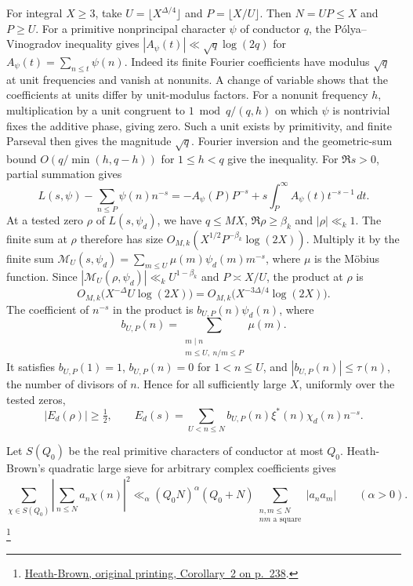 %
For integral \(X\ge3\), take \(U=\lfloor X^{\Delta/4}\rfloor\) and
\(P=\lfloor X/U\rfloor\). Then \(N=UP\le X\) and \(P\ge U\).
For a primitive nonprincipal character \(\psi\) of conductor \(q\),
the P\'olya--Vinogradov inequality gives
\(|A_\psi(t)|\ll\sqrt q\log(2q)\) for \(A_\psi(t)=\sum_{n\le t}\psi(n)\).
Indeed its finite Fourier coefficients have modulus \(\sqrt q\) at
unit frequencies and vanish at nonunits. A change of variable shows
that the coefficients at units differ by unit-modulus factors.
For a nonunit frequency \(h\), multiplication by a unit congruent to
\(1\bmod q/(q,h)\) on which \(\psi\) is nontrivial fixes the additive
phase, giving zero. Such a unit exists by primitivity, and finite
Parseval then gives the magnitude \(\sqrt q\).
Fourier inversion and the geometric-sum bound
\(O(q/\min(h,q-h))\) for \(1\le h<q\) give the inequality.
For \(\Re s>0\), partial summation gives
\[
 L(s,\psi)-\sum_{n\le P}\psi(n)n^{-s}
   =-A_\psi(P)P^{-s}+s\int_P^\infty A_\psi(t)t^{-s-1}\,dt .
\]
At a tested zero \(\rho\) of \(L(s,\psi_d)\), we have \(q\le MX\),
\(\Re\rho\ge\beta_k\) and \(|\rho|\ll_k1\). The finite sum at \(\rho\)
therefore has size \(O_{M,k}(X^{1/2}P^{-\beta_k}\log(2X))\).
Multiply it by the finite sum
\(\mathcal M_U(s,\psi_d)=\sum_{m\le U}\mu(m)\psi_d(m)m^{-s}\),
where \(\mu\) is the M\"obius function.
Since \(|\mathcal M_U(\rho,\psi_d)|\ll_k U^{1-\beta_k}\) and
\(P\asymp X/U\), the product at \(\rho\) is
\[
 O_{M,k}\bigl(X^{-\Delta}U\log(2X)\bigr)
     =O_{M,k}\bigl(X^{-3\Delta/4}\log(2X)\bigr).
\]
The coefficient of \(n^{-s}\) in the product is
\(b_{U,P}(n)\psi_d(n)\), where
\[
 b_{U,P}(n)=\sum_{\substack{m\mid n\\m\le U,\ n/m\le P}}\mu(m).
\]
It satisfies \(b_{U,P}(1)=1\), \(b_{U,P}(n)=0\) for \(1<n\le U\),
and \(|b_{U,P}(n)|\le\tau(n)\), the number of divisors of \(n\).
Hence for all sufficiently large \(X\), uniformly over the tested zeros,
\begin{equation}\label{eq:weighted-mollified-zero-test}
 \left|E_d(\rho)\right|\ge\tfrac12,\qquad
 E_d(s)=\sum_{U<n\le N}b_{U,P}(n)\xi^*(n)\chi_d(n)n^{-s}.
\end{equation}

%
Let \(S(Q_0)\) be the real primitive characters of conductor at most
\(Q_0\). Heath-Brown's quadratic large sieve for arbitrary complex
coefficients gives
\[
 \sum_{\chi\in S(Q_0)}
       \left|\sum_{n\le N}a_n\chi(n)\right|^2
 \ll_\alpha (Q_0N)^\alpha(Q_0+N)
     \sum_{\substack{n,m\le N\\nm\text{ a square}}}|a_n a_m|
 \qquad(\alpha>0).
\]
\cite[Corollary~2, p.~238]{f1heath-brown}\footnote{\href{https://matwbn.icm.edu.pl/ksiazki/aa/aa72/aa7234.pdf\#page=4}{Heath-Brown, original printing, Corollary~2 on p.~238}.}

